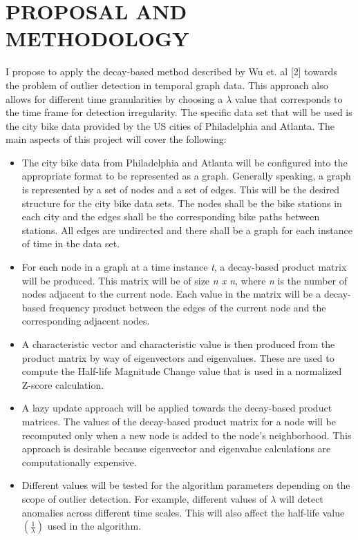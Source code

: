 \documentclass[letterpaper, 10 pt, conference]{ieeeconf}  %
\begin{document}
\section{PROPOSAL AND METHODOLOGY}
I propose to apply the decay-based method described by Wu et. al [2] towards the problem of outlier detection in temporal graph data. This approach also allows for different time granularities by choosing a $\lambda$ value that corresponds to the time frame for detection irregularity. The specific data set that will be used is the city bike data provided by the US cities of Philadelphia and Atlanta. The main aspects of this project will cover the following:
\begin{itemize}
    \item The city bike data from Philadelphia and Atlanta will be configured into the appropriate format to be represented as a graph. Generally speaking, a graph is represented by a set of nodes and a set of edges. This will be the desired structure for the city bike data sets. The nodes shall be the bike stations in each city and the edges shall be the corresponding bike paths between stations. All edges are undirected and there shall be a graph for each instance of time in the data set.
    \item For each node in a graph at a time instance \textit{t}, a decay-based product matrix will be produced. This matrix will be of size \textit{n x n}, where \textit{n} is the number of nodes adjacent to the current node. Each value in the matrix will be a decay-based frequency product between the edges of the current node and the corresponding adjacent nodes. 
    \item A characteristic vector and characteristic value is then produced from the product matrix by way of eigenvectors and eigenvalues. These are used to compute the Half-life Magnitude Change value that is used in a normalized Z-score calculation.
    \item A lazy update approach will be applied towards the decay-based product matrices. The values of the decay-based product matrix for a node will be recomputed only when a new node is added to the node’s neighborhood. This approach is desirable because eigenvector and eigenvalue calculations are computationally expensive.
    \item Different values will be tested for the algorithm parameters depending on the scope of outlier detection. For example, different values of $\lambda$ will detect anomalies across different time scales. This will also affect the half-life value $(\frac{1}{\lambda})$ used in the algorithm.
\end{itemize}
\end{document}
